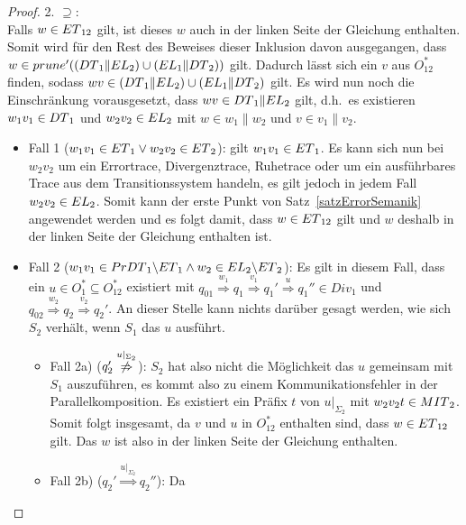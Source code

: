 \begin{proof}
  2. \glqq{}$\supseteq$\grqq{}:\\
  Falls $w\in ET{}_{12}$ gilt, ist dieses $w$ auch in der linken Seite der
  Gleichung enthalten. Somit wird für den Rest des Beweises dieser Inklusion
  davon ausgegangen, dass $w\in prune'{}((DT{}_1\|EL{}_2)\cup
  (EL{}_1\|DT{}_2))$ gilt. Dadurch lässt sich ein $v$ aus $O_{12}^*$ finden,
  sodass $wv\in (DT{}_1\|EL{}_2)\cup (EL{}_1\|DT{}_2)$ gilt. Es wird nun
  noch die Einschränkung vorausgesetzt, dass \oBdA{} $wv\in DT{}_1\|EL{}_2$
  gilt, d.h.\ es existieren $w_1v_1\in DT{}_1$ und $w_2v_2\in EL{}_2$ mit $w\in
  w_1\|w_2$ und $v\in v_1\|v_2$.
  \begin{itemize}
    \item Fall 1 ($w_1v_1\in ET{}_1 \vee w_2v_2\in ET{}_2$): \OBdA{} gilt
      $w_1v_1\in ET{}_1$. Es kann sich nun bei $w_2v_2$ um ein Errortrace,
      Divergenztrace, Ruhetrace oder um ein ausführbares Trace aus dem
      Transitionssystem handeln, es gilt jedoch in jedem Fall $w_2v_2\in EL{}_2$.
      Somit kann der erste Punkt von Satz~\ref{satzErrorSemanik} angewendet
      werden und es folgt damit, dass $w\in ET{}_{12}$ gilt und $w$ deshalb in
      der linken Seite der Gleichung enthalten ist.
    \item Fall 2 ($w_1v_1\in PrDT{}_1\backslash ET{}_1 \wedge w_2\in
      EL{}_2\backslash ET{}_2$): Es gilt in diesem Fall, dass ein $u\in
      O_1^*\subseteq O_{12}^*$ existiert mit $q_{01} \overset{w_1}{\Rightarrow}
      q_1 \overset{v_1}{\Rightarrow} q_1' \overset{u}{\Rightarrow} q_1''\in
      Div_1$ und $q_{02} \overset{w_2}{\Rightarrow} q_2
      \overset{v_2}{\Rightarrow} q_2'$. An dieser Stelle kann nichts darüber
      gesagt werden, wie sich $S_2$ verhält, wenn $S_1$ das $u$ ausführt.
      \begin{itemize}
        \item Fall 2a) \Big($q_2' \overset{u|_{\Sigma
          _2}}{\not{\hspace{-0.1cm}\Rightarrow}}$\Big): $S_2$ hat also nicht die
          Möglichkeit das $u$ gemeinsam mit $S_1$ auszuführen, es kommt also zu
          einem Kommunikationsfehler in der Parallelkomposition. Es existiert
          ein Präfix $t$ von $u|_{\Sigma _2}$ mit $w_2v_2t\in MIT{}_2$. Somit
          folgt insgesamt, da $v$ und $u$ in $O_{12}^*$ enthalten sind, dass
          $w\in ET{}_{12}$ gilt. Das $w$ ist also in der linken Seite der
          Gleichung enthalten.
        \item Fall 2b) ($q_2' \overset{u|_{\Sigma _2}}{\Rightarrow} q_2''$): Da

\end{itemize}
\end{itemize}
\end{proof}

